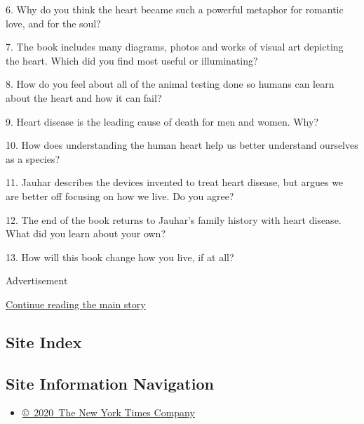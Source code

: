 6. Why do you think the heart became such a powerful metaphor for
romantic love, and for the soul?

7. The book includes many diagrams, photos and works of visual art
depicting the heart. Which did you find most useful or illuminating?

8. How do you feel about all of the animal testing done so humans can
learn about the heart and how it can fail?

9. Heart disease is the leading cause of death for men and women. Why?

10. How does understanding the human heart help us better understand
ourselves as a species?

11. Jauhar describes the devices invented to treat heart disease, but
argues we are better off focusing on how we live. Do you agree?

12. The end of the book returns to Jauhar's family history with heart
disease. What did you learn about your own?

13. How will this book change how you live, if at all?

Advertisement

\protect\hyperlink{after-bottom}{Continue reading the main story}

\hypertarget{site-index}{%
\subsection{Site Index}\label{site-index}}

\hypertarget{site-information-navigation}{%
\subsection{Site Information
Navigation}\label{site-information-navigation}}

\begin{itemize}
\tightlist
\item
  \href{https://help.nytimes3xbfgragh.onion/hc/en-us/articles/115014792127-Copyright-notice}{©~2020~The
  New York Times Company}
\end{itemize}

